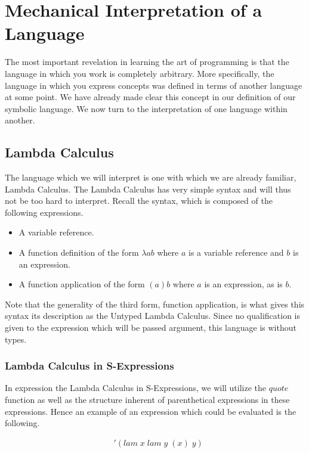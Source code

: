 
\chapter{Mechanical Interpretation of a Language}
The most important revelation in learning the art of programming is that the 
language in which you work is completely arbitrary. More specifically, the 
language in which you express concepts was defined in terms of another language 
at some point. We have already made clear this concept in our definition of our 
symbolic language. We now turn to the interpretation of one language within 
another.

\section{Lambda Calculus}
The language which we will interpret is one with which we are already familiar, 
Lambda Calculus. The Lambda Calculus has very simple syntax and will thus not 
be too hard to interpret. Recall the syntax, which is composed of the following 
expressions.

\begin{itemize}
  \item A variable reference.
  \item A function definition of the form $\lambda a b$ where $a$ is a variable reference and $b$ is an expression.
  \item A function application of the form $(a)b$ where $a$ is an expression, as is $b$.
\end{itemize}

Note that the generality of the third form, function application, is what gives 
this syntax its description as the Untyped Lambda Calculus. Since no 
qualification is given to the expression which will be passed argument, this 
language is without types.

\subsection{Lambda Calculus in S-Expressions}
In expression the Lambda Calculus in S-Expressions, we will utilize the $quote$ 
function as well as the structure inherent of parenthetical expressions in these 
expressions. Hence an example of an expression which could be evaluated is the 
following.

\begin{figure}[ht]
\caption{}\label{scheme}
\begin{align*}
& '(lam \; x \; lam \; y \; (x) \; y)
\end{align*}
\end{figure}

